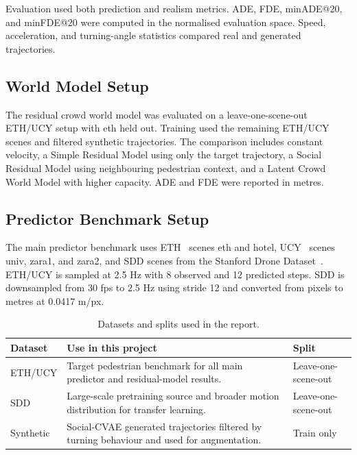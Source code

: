 \documentclass[conference]{IEEEtran}
\begin{document}
Evaluation used both prediction and realism metrics. ADE, FDE, minADE@20, and
minFDE@20 were computed in the normalised evaluation space. Speed,
acceleration, and turning-angle statistics compared real and generated
trajectories.

\subsection{World Model Setup}

The residual crowd world model was evaluated on a leave-one-scene-out ETH/UCY
setup with eth held out. Training used the remaining ETH/UCY scenes and filtered
synthetic trajectories. The comparison includes constant velocity, a Simple Residual Model
using only the target trajectory, a Social Residual Model using neighbouring
pedestrian context, and a Latent Crowd World Model with higher capacity. ADE
and FDE were reported in metres.

\subsection{Predictor Benchmark Setup}

The main predictor benchmark uses ETH~\cite{pellegrini2009you} scenes eth and
hotel, UCY~\cite{lerner2007crowds} scenes univ, zara1, and zara2, and SDD
scenes from the Stanford Drone Dataset~\cite{robicquet2016learning}. ETH/UCY is
sampled at 2.5 Hz with 8 observed and 12 predicted steps. SDD is downsampled
from 30 fps to 2.5 Hz using stride 12 and converted from pixels to metres at
0.0417 m/px.

\begin{table}[t]
\caption{Datasets and splits used in the report.}
\label{tab:datasets}
\centering
\scriptsize
\setlength{\tabcolsep}{3pt}
\renewcommand{\arraystretch}{1.12}
\begin{tabularx}{\columnwidth}{@{}p{1.35cm}X p{1.55cm}@{}}
\toprule
\textbf{Dataset} & \textbf{Use in this project} & \textbf{Split} \\
\midrule
ETH/UCY & Target pedestrian benchmark for all main predictor and residual-model results. & Leave-one-scene-out \\
SDD & Large-scale pretraining source and broader motion distribution for transfer learning. & Leave-one-scene-out \\
Synthetic & Social-CVAE generated trajectories filtered by turning behaviour and used for augmentation. & Train only \\
\bottomrule
\end{tabularx}
\end{table}
\end{document}
